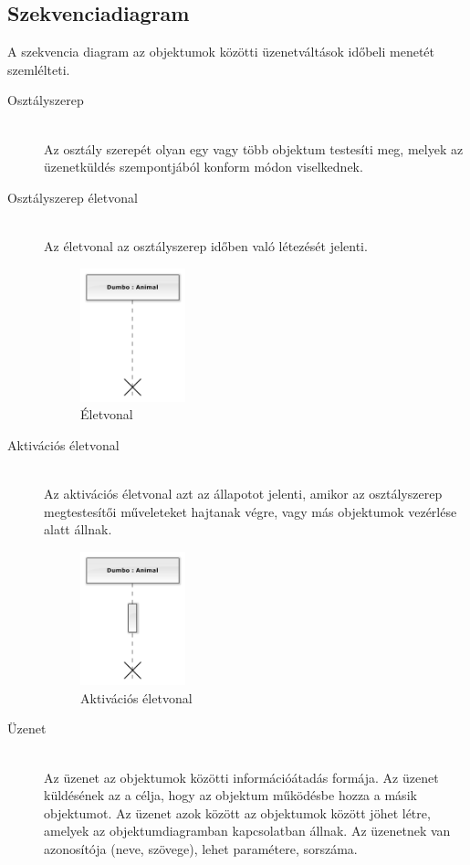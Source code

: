 \documentclass[margin=0px]{article}
\begin{document}
\subsection{Szekvenciadiagram}
A szekvencia diagram az objektumok közötti üzenetváltások időbeli menetét
szemlélteti.
\begin{description}
    \item[Osztályszerep] \hfill \\
        Az osztály szerepét olyan egy vagy több objektum testesíti meg, melyek az üzenetküldés szempontjából konform módon viselkednek.
    \item[Osztályszerep életvonal] \hfill \\
        Az életvonal az osztályszerep időben való létezését jelenti.
        \begin{figure}[H]
            \centering
            \includegraphics[width=0.3\textwidth]{img/eletvonal.png}
            \caption{Életvonal}
        \end{figure}
    \item[Aktivációs életvonal] \hfill \\
        Az aktivációs életvonal azt az állapotot jelenti, amikor az osztályszerep megtestesítői műveleteket hajtanak végre, vagy más objektumok vezérlése alatt állnak.
        \begin{figure}[H]
            \centering
            \includegraphics[width=0.3\textwidth]{img/aktivacios_eletvonal.png}
            \caption{Aktivációs életvonal}
        \end{figure}
    \item[Üzenet] \hfill \\
        Az üzenet az objektumok közötti információátadás formája. Az üzenet küldésének az a célja, hogy az objektum működésbe hozza a másik objektumot. Az üzenet azok között az objektumok között jöhet létre, amelyek az objektumdiagramban kapcsolatban állnak. Az üzenetnek van azonosítója (neve, szövege), lehet paramétere, sorszáma.

\end{description}
\end{document}
